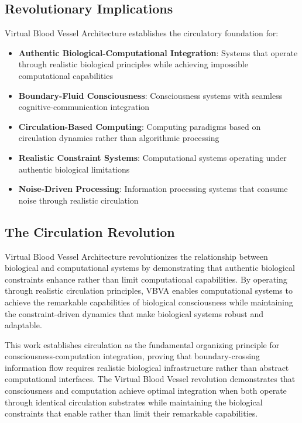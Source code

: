 \documentclass[12pt,a4paper]{article}
\begin{document}
\subsection{Revolutionary Implications}

Virtual Blood Vessel Architecture establishes the circulatory foundation for:

\begin{itemize}
\item \textbf{Authentic Biological-Computational Integration}: Systems that operate through realistic biological principles while achieving impossible computational capabilities
\item \textbf{Boundary-Fluid Consciousness}: Consciousness systems with seamless cognitive-communication integration
\item \textbf{Circulation-Based Computing}: Computing paradigms based on circulation dynamics rather than algorithmic processing
\item \textbf{Realistic Constraint Systems}: Computational systems operating under authentic biological limitations
\item \textbf{Noise-Driven Processing}: Information processing systems that consume noise through realistic circulation
\end{itemize}

\subsection{The Circulation Revolution}

Virtual Blood Vessel Architecture revolutionizes the relationship between biological and computational systems by demonstrating that authentic biological constraints enhance rather than limit computational capabilities. By operating through realistic circulation principles, VBVA enables computational systems to achieve the remarkable capabilities of biological consciousness while maintaining the constraint-driven dynamics that make biological systems robust and adaptable.

This work establishes circulation as the fundamental organizing principle for consciousness-computation integration, proving that boundary-crossing information flow requires realistic biological infrastructure rather than abstract computational interfaces. The Virtual Blood Vessel revolution demonstrates that consciousness and computation achieve optimal integration when both operate through identical circulation substrates while maintaining the biological constraints that enable rather than limit their remarkable capabilities.
\end{document}
